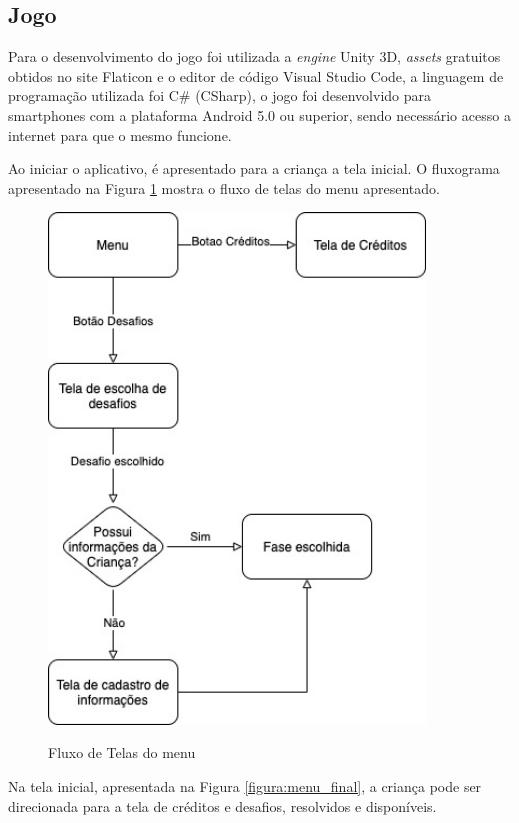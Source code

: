     \subsection{Jogo}
    
    Para o desenvolvimento do jogo foi utilizada a \textit{engine} Unity 3D, \textit{assets} gratuitos obtidos no site Flaticon \cite{flaticon} e o editor de código Visual Studio Code, a linguagem de programação utilizada foi C\# (CSharp), o jogo foi desenvolvido para smartphones com a plataforma Android 5.0 ou superior, sendo necessário acesso a internet para que o mesmo funcione.
    
    Ao iniciar o aplicativo, é apresentado para a criança a tela inicial. O fluxograma apresentado na Figura \ref{figura:fluxo_telas} mostra o fluxo de telas do menu apresentado.
    
    \begin{figure}[H]
        \caption{Fluxo de Telas do menu}
        \centering
        \includegraphics[width=10cm]{Imagens/Cap4/fluxo_menu.jpg}
        \label{figura:fluxo_telas}
    \end{figure}
    
    Na tela inicial, apresentada na Figura \ref{figura:menu_final}, a criança pode ser direcionada para a tela de créditos e desafios, resolvidos e disponíveis. 
    
